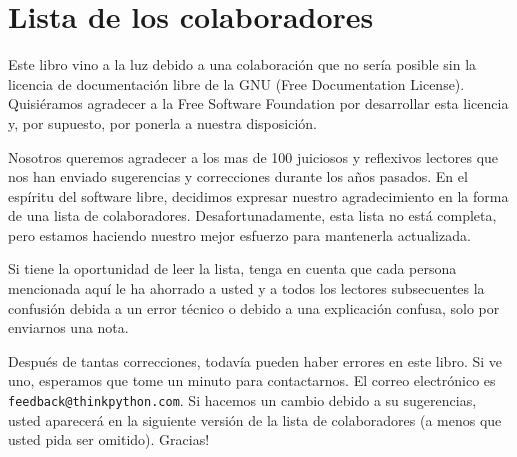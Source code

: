 


\chapter{Lista de los colaboradores}

Este libro vino a la luz debido a una colaboración que no sería posible sin 
la licencia de documentación libre de la GNU (Free Documentation License).  
Quisiéramos agradecer a la Free Software Foundation por desarrollar esta licencia y, 
por supuesto, por ponerla a nuestra disposición.

Nosotros queremos agradecer a los mas de 100 juiciosos y reflexivos lectores 
que nos han enviado sugerencias y correcciones durante los años pasados.  
En el espíritu del  software libre, decidimos expresar nuestro agradecimiento en 
la forma de una lista de colaboradores.  Desafortunadamente, esta lista no está 
completa, pero estamos haciendo nuestro mejor esfuerzo para mantenerla actualizada.

Si tiene la oportunidad de leer la lista, tenga en cuenta que cada persona mencionada aquí le ha
 ahorrado a usted y a todos los lectores subsecuentes  la confusión debida a un
error técnico o debido a una explicación confusa, solo por enviarnos una nota.

Después de tantas correcciones, todavía pueden haber errores en este libro.  
Si ve uno, esperamos que tome un minuto para contactarnos.  El correo electrónico es
\texttt{feedback@thinkpython.com}.  Si hacemos un cambio debido a su sugerencias,
usted aparecerá en la siguiente versión de la lista de colaboradores (a menos que
usted pida ser omitido).  Gracias!


